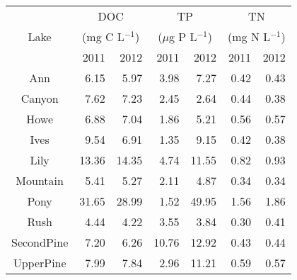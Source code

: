 \begin{table}[ht]
\centering
\begin{tabular}{crrrrrr}
  \hline
\hline
   & \multicolumn{2}{c}{DOC} & 
                      \multicolumn{2}{c}{TP} & 
                      \multicolumn{2}{c}{TN}\\
 Lake & \multicolumn{2}{c}{(mg C L$^{-1}$)} & 
                      \multicolumn{2}{c}{($\mu$g P L$^{-1}$)} & 
                      \multicolumn{2}{c}{(mg N L$^{-1}$)}\\
  & 2011 & 2012 & 2011 & 2012 & 2011 & 2012 \\
 \hline
Ann & 6.15 & 5.97 & 3.98 & 7.27 & 0.42 & 0.43 \\ 
  Canyon & 7.62 & 7.23 & 2.45 & 2.64 & 0.44 & 0.38 \\ 
  Howe & 6.88 & 7.04 & 1.86 & 5.21 & 0.56 & 0.57 \\ 
  Ives & 9.54 & 6.91 & 1.35 & 9.15 & 0.42 & 0.38 \\ 
  Lily & 13.36 & 14.35 & 4.74 & 11.55 & 0.82 & 0.93 \\ 
  Mountain & 5.41 & 5.27 & 2.11 & 4.87 & 0.34 & 0.34 \\ 
  Pony & 31.65 & 28.99 & 1.52 & 49.95 & 1.56 & 1.86 \\ 
  Rush & 4.44 & 4.22 & 3.55 & 3.84 & 0.30 & 0.41 \\ 
  SecondPine & 7.20 & 6.26 & 10.76 & 12.92 & 0.43 & 0.44 \\ 
  UpperPine & 7.99 & 7.84 & 2.96 & 11.21 & 0.59 & 0.57 \\ 
   \hline
\end{tabular}
\end{table}
